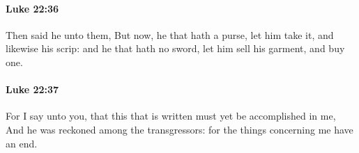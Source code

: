 		\paragraph{Luke 22:36} %
			\label{LUKE-22-36}

			Then said he unto them, But now, he that hath a purse, let him take it, and likewise his scrip: and he that hath no sword, let him sell his garment, and buy one.

			\begin{framed}
			\scriptsize
				\begin{compactdesc}
					\item[SBLG] 
				\end{compactdesc}
			\end{framed}

		\paragraph{Luke 22:37} %
			\label{LUKE-22-37}

			For I say unto you, that this that is written must yet be accomplished in me, And he was reckoned among the transgressors: for the things concerning me have an end.

